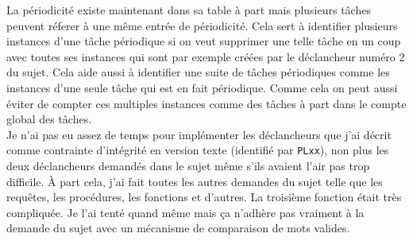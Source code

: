 \documentclass[12pt]{article}
\begin{document}
La périodicité existe maintenant dans sa table à part mais plusieurs tâches
peuvent réferer à une même entrée de périodicité. Cela sert à identifier
plusieurs instances d'une tâche périodique si on veut supprimer une telle tâche
en un coup avec toutes ses instances qui sont par exemple créées par le
déclancheur numéro 2 du sujet. Cela aide aussi à identifier une suite de tâches
périodiques comme les instances d'une seule tâche qui est en fait périodique.
Comme cela on peut aussi éviter de compter ces multiples instances comme des
tâches à part dans le compte global des tâches. \\

Je n'ai pas eu assez de temps pour implémenter les déclancheurs que j'ai décrit
comme contrainte d'intégrité en version texte (identifié par \texttt{PLxx}), non
plus les deux déclancheurs demandés dans le sujet même s'ils avaient l'air pas
trop difficile. À part cela, j'ai fait toutes les autres demandes du sujet telle
que les requêtes, les procédures, les fonctions et d'autres. La troisième
fonction était très compliquée. Je l'ai tenté quand même mais ça n'adhère pas
vraiment à la demande du sujet avec un mécanisme de comparaison de mots valides.


\end{document}
